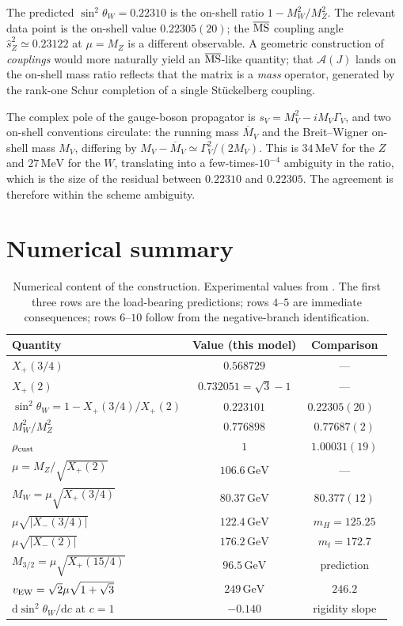 \documentclass[aps,prd,onecolumn,superscriptaddress,nofootinbib,reprint]{revtex4-2}
\newcommand{\Xp}{X_{+}}
\newcommand{\Xm}{X_{-}}
\newcommand{\sinsq}{\sin^{2}\!\theta_{W}}
\newcommand{\cA}{\mathcal{A}}
\newcommand{\dd}{\mathrm{d}}
\begin{document}
The predicted $\sinsq=0.22310$ is the on-shell ratio
$1-M_{W}^{2}/M_{Z}^{2}$.  The relevant data point is the on-shell
value $0.22305(20)$; the $\overline{\rm MS}$ coupling angle
$\hat s_{Z}^{2}\simeq 0.23122$ at $\mu=M_{Z}$ is a different
observable.  A
geometric construction of \emph{couplings} would more naturally yield
an $\overline{\rm MS}$-like quantity; that $\cA(J)$ lands on the
on-shell mass ratio reflects that the matrix is a \emph{mass}
operator, generated by the rank-one Schur completion of a single
Stückelberg coupling.

The complex pole of the gauge-boson propagator is
$s_{V}=M_{V}^{2}-iM_{V}\Gamma_{V}$, and two on-shell conventions
circulate: the running mass $\overline{M}_{V}$ and the Breit--Wigner
on-shell mass $M_{V}$, differing by
$M_{V}-\overline{M}_{V}\simeq\Gamma_{V}^{2}/(2M_{V})$.  This is
$34\,\text{MeV}$ for the $Z$ and $27\,\text{MeV}$ for the $W$,
translating into a few-times-$10^{-4}$ ambiguity in the ratio, which
is the size of the residual between $0.22310$ and $0.22305$.  The
agreement is therefore within the scheme ambiguity.

\section{Numerical summary}
\label{app:numbers}

\begin{table}[h]
\centering
\begin{tabular}{lcc}
\toprule
Quantity & Value (this model) & Comparison\\
\midrule
$\Xp(3/4)$ & $0.568729$ & ---\\
$\Xp(2)$ & $0.732051=\sqrt 3-1$ & ---\\
$\sinsq=1-\Xp(3/4)/\Xp(2)$ & $0.223101$ & $0.22305(20)$\,~\cite{PDG2024}\\
$M_{W}^{2}/M_{Z}^{2}$ & $0.776898$ & $0.77687(2)$\\
$\rho_{\rm cust}$ & $1$ & $1.00031(19)$\\
$\mu=M_{Z}/\sqrt{\Xp(2)}$ & $106.6\,\text{GeV}$ & ---\\
$M_{W}=\mu\sqrt{\Xp(3/4)}$ & $80.37\,\text{GeV}$ & $80.377(12)$\\
$\mu\sqrt{|\Xm(3/4)|}$ & $122.4\,\text{GeV}$ & $m_{H}=125.25$\\
$\mu\sqrt{|\Xm(2)|}$ & $176.2\,\text{GeV}$ & $m_{t}=172.7$\\
$M_{3/2}=\mu\sqrt{\Xp(15/4)}$ & $96.5\,\text{GeV}$ & prediction\\
$v_{\rm EW}=\sqrt 2\mu\sqrt{1+\sqrt 3}$ & $249\,\text{GeV}$ & $246.2$\\
$\dd\sinsq/\dd c$ at $c=1$ & $-0.140$ & rigidity slope\\
\bottomrule
\end{tabular}
\caption{Numerical content of the construction.  Experimental values
from \cite{PDG2024}.  The first three rows are the load-bearing
predictions; rows $4$--$5$ are immediate consequences; rows $6$--$10$
follow from the negative-branch identification.}
\label{tab:numerics}
\end{table}
\end{document}

